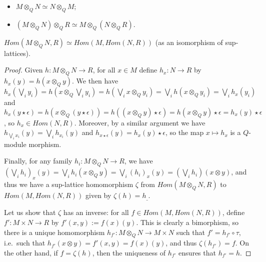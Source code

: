 \begin{lemma}
\begin{itemize}
\item $M\otimes_{Q}N\simeq N\otimes_{Q}M$;

\item $(M\otimes_{Q}N)\otimes_{Q}R \simeq M\otimes_{Q}(N\otimes_{Q}R)$.
\end{itemize}
\end{lemma}

\begin{proposition}
$Hom(M\otimes_{Q}N, R)   \simeq   Hom(M, Hom(N,R))$ (as an isomorphism of sup-lattices).
\end{proposition}
\begin{proof}
Given $h:M\otimes_{Q}N\to R$, for all $x\in M$ define $h_{x}:N\to R$ by 
$h_{x}(y)=h(x\otimes_{Q}y)$. We then have 
$h_{x}(\bigvee_{i}y_{i})=h(x\otimes_{Q}\bigvee_{i}y_{i})=
h(\bigvee_{i}x\otimes_{Q} y_{i})=
\bigvee_{i}h(x\otimes_{Q} y_{i})=\bigvee_{i}h_{x}(y_{i})$ and 
$h_{x}(y\star\epsilon)= h(x\otimes_{Q}(y\star \epsilon))=h((x\otimes_{Q}y)\star\epsilon)=h(x\otimes_{Q}y)\star \epsilon= h_{x}(y)\star\epsilon$, so $h_{x}\in Hom(N,R)$. Moreover, by a similar argument we have  $h_{\bigvee_{i}x_{i}}(y)=\bigvee_{i}h_{x_{i}}(y)$
and $h_{x\star\epsilon}(y)=h_{x}(y)\star\epsilon$, so the map $x\mapsto h_{x}$ is a $Q$-module morphism. 

Finally, for any family $h_{i}:M\otimes_{Q}N\to R$, we have 
$(\bigvee_{i}h_{i})_{x}(y)=\bigvee_{i}h_{i}(x\otimes_{Q}y)=\bigvee_{i}(h_{i})_{x}(y)=(\bigvee_{i}h_{i})(x\otimes y)$, and thus we have a sup-lattice homomorphism $\zeta$ from $Hom(M\otimes_{Q}N,R)$ to $Hom(M,Hom(N,R))$ given by $\zeta(h)=h_{\_}$.

Let us show that $\zeta$ has an inverse:  for all $f\in Hom(M,Hom(N,R))$, define $f': M\times N\to R$ by $f'(x,y):=f(x)(y)$. This is clearly a bimorphism, so there is a unique homomorphism $h_{f'}:M\otimes_{Q}N\to M\times N$ such that $f'=h_{f'}\circ \tau$, i.e.~such that 
$h_{f'}(x\otimes y)=f'(x,y)=f(x)(y)$, and thus $\zeta(h_{f'})=f$.
On the other hand, if $f=\zeta(h)$, then the uniqueness of $h_{f'}$ ensures that $h_{f'}=h$.
\end{proof}





